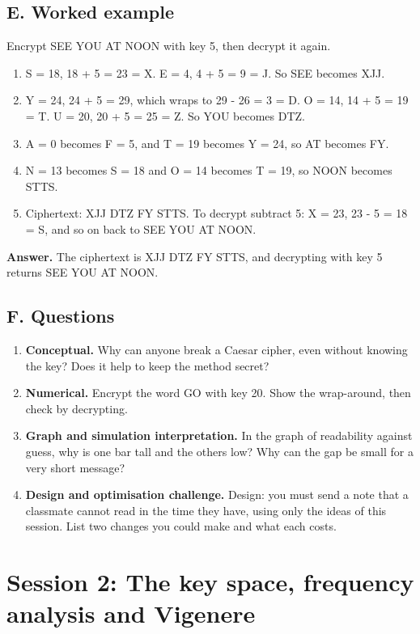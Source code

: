\documentclass[11pt,a4paper]{article}
\begin{document}
\subsection*{E. Worked example}
Encrypt SEE YOU AT NOON with key 5, then decrypt it again.
\begin{enumerate}[nosep]
\item S = 18, 18 + 5 = 23 = X. E = 4, 4 + 5 = 9 = J. So SEE becomes XJJ.
\item Y = 24, 24 + 5 = 29, which wraps to 29 - 26 = 3 = D. O = 14, 14 + 5 = 19 = T. U = 20, 20 + 5 = 25 = Z. So YOU becomes DTZ.
\item A = 0 becomes F = 5, and T = 19 becomes Y = 24, so AT becomes FY.
\item N = 13 becomes S = 18 and O = 14 becomes T = 19, so NOON becomes STTS.
\item Ciphertext: XJJ DTZ FY STTS. To decrypt subtract 5: X = 23, 23 - 5 = 18 = S, and so on back to SEE YOU AT NOON.
\end{enumerate}
\textbf{Answer.} The ciphertext is XJJ DTZ FY STTS, and decrypting with key 5 returns SEE YOU AT NOON.

\subsection*{F. Questions}
\begin{enumerate}[nosep]
\item \textbf{Conceptual.} Why can anyone break a Caesar cipher, even without knowing the key? Does it help to keep the method secret?
\item \textbf{Numerical.} Encrypt the word GO with key 20. Show the wrap-around, then check by decrypting.
\item \textbf{Graph and simulation interpretation.} In the graph of readability against guess, why is one bar tall and the others low? Why can the gap be small for a very short message?
\item \textbf{Design and optimisation challenge.} Design: you must send a note that a classmate cannot read in the time they have, using only the ideas of this session. List two changes you could make and what each costs.
\end{enumerate}

\section{Session 2: The key space, frequency analysis and Vigenere}
\end{document}

